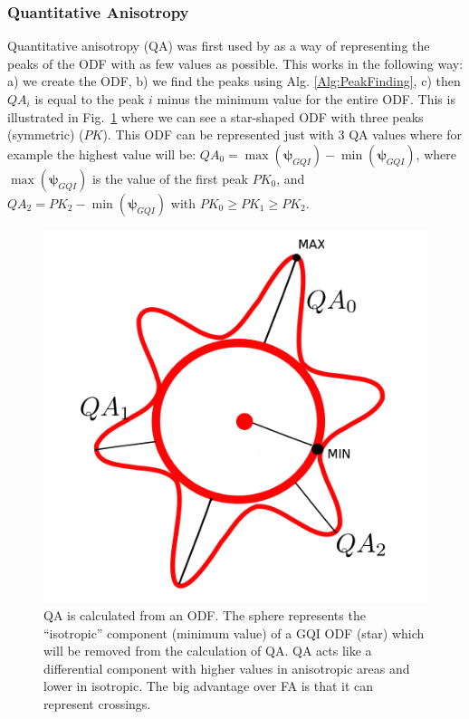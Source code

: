 \documentclass{bioinfo}
\begin{document}
\subsubsection{Quantitative Anisotropy\label{sub:Quantitative-Anisotropy}}

Quantitative anisotropy (QA) was first used by \citet{Yeh2010}
as a way of representing the peaks of the ODF with as few values as
possible. This works in the following way: a) we create the ODF, b)
we find the peaks using Alg. \ref{Alg:PeakFinding}, c) then $QA_{i}$
is equal to the peak $i$ minus the minimum value for the entire ODF.
This is illustrated in Fig.~\ref{Flo:QA_sketch} where we can see
a star-shaped ODF with three peaks (symmetric) ($PK$). This ODF can
be represented just with $3$ QA values where for example the highest
value will be: $QA_{0}=\max(\bm{\psi}_{GQI})-\min(\bm{\psi}_{GQI})$,
where $\max(\bm{\psi}_{GQI})$ is the value of the first peak $PK_{0}$,
and $QA_{2}=PK_{2}-\min(\bm{\psi}_{GQI})$ with $PK_{0}\geq PK_{1}\geq PK_{2}$.

%
\begin{figure}
[th!]

\begin{centering}
\includegraphics[scale=0.6]{figures/QA}
\par\end{centering}

\caption{QA is calculated from an ODF. The sphere represents the {}``isotropic''
component (minimum value) of a GQI ODF (star) which will be removed
from the calculation of QA. QA acts like a differential component
with higher values in anisotropic areas and lower in isotropic. The
big advantage over FA is that it can represent crossings.}


\label{Flo:QA_sketch}
\end{figure}
\end{document}
